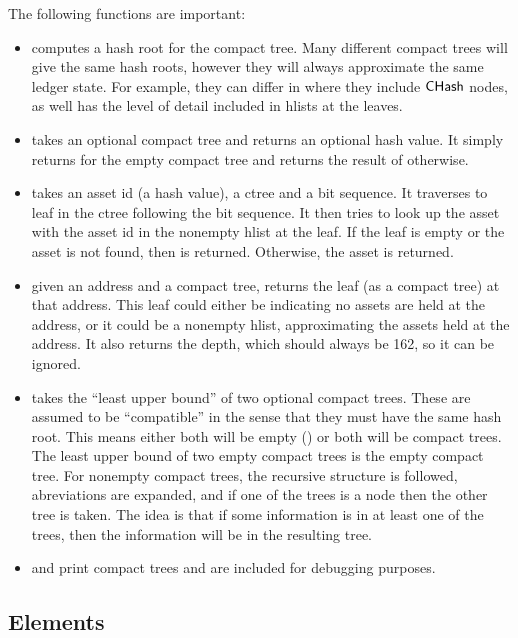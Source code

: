 The following functions are important:
\begin{itemize}
\item {} computes a hash root for the compact tree.
Many different compact trees will give the same hash roots, however they will
always approximate the same ledger state.
For example, they can differ in where they include ${\constr{CHash}}$ nodes,
as well has the level of detail included in
hlists at the leaves.
\item {} takes an optional compact tree and returns an optional hash value.
It simply returns {} for the empty compact tree {}
and returns the result of {} otherwise.
\item {} takes an asset id (a hash value), a ctree and a bit sequence.
It traverses to leaf in the ctree following the bit sequence.
It then tries to look up the asset with the asset id in the nonempty hlist at the leaf.
If the leaf is empty or the asset is not found, then {} is returned. Otherwise, the asset is returned.
\item {} given an address and a compact tree,
returns the leaf (as a compact tree) at that address.
This leaf could either be {} indicating no assets are held at the address,
or it could be a nonempty hlist, approximating the assets held at the address.
It also returns the depth, which should always be 162, so it can be ignored.
\item {} takes the ``least upper bound'' of two optional compact trees.
These are assumed to be ``compatible'' in the sense that they must have the same hash root.
This means either both will be empty ({})
or both will be compact trees.
The least upper bound of two empty compact trees is the empty compact tree.
For nonempty compact trees, the recursive structure is followed,
abreviations are expanded, and if one of the trees is a {}
node then the other tree is taken.
The idea is that if some information is in at least one of the trees,
then the information will be in the resulting tree.
\item {} and {} print compact trees and are included for debugging purposes.
\end{itemize}

\subsection{Elements}


